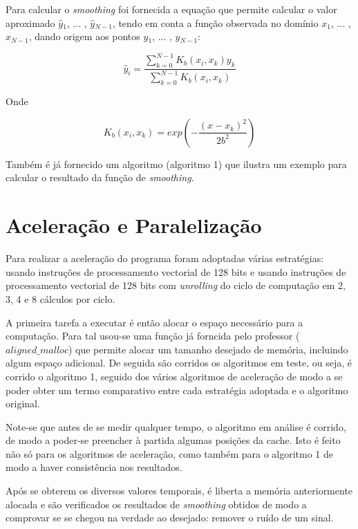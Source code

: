 \documentclass[a4paper]{article}
\begin{document}
	Para calcular o \textit{smoothing} foi fornecida a equação que permite calcular o valor aproximado $\hat{y}$$ _1$, $...$ , $\hat{y}$$ _{N-1}$, tendo em conta a função observada no domínio $x$$ _1$, $...$ , $x$$ _{N-1}$, dando origem aos pontos $y$$ _1$, $...$ , $y$$ _{N-1}$:
	
	\begin{equation}
		\hat{y}_i =  \frac{ \sum_{k=0}^{N-1} K_b (x_i, x_k ) y_k}{\sum_{k=0}^{N-1} K_b (x_i, x_k )} 
		\label{eq:smoothing_function}
	\end{equation}
	
	Onde
	
	\begin{equation}
		K_b (x_i,x_k)=exp\left(-\frac{(x-x_k)^2}{2b^2} \right)
		\label{eq:smoothing_kb}
	\end{equation}
	 	
	 	 
	Também é já fornecido um algoritmo (algoritmo 1) que ilustra um exemplo para calcular o resultado da função de \textit{smoothing}.
	
	
	\section{Aceleração e Paralelização}
	
	Para realizar a aceleração do programa foram adoptadas várias estratégias: usando instruções de processamento vectorial de 128 bits e usando instruções de processamento vectorial de 128 bits com \textit{unrolling} do ciclo de computação em 2, 3, 4 e 8 cálculos por ciclo.
	
	A primeira tarefa a executar é então alocar o espaço necessário para a computação. Para tal usou-se uma função já forncida pelo professor ($aligned\_malloc$) que permite alocar um tamanho desejado de memória, incluindo algum espaço adicional. De seguida são corridos os algoritmos em teste, ou seja, é corrido o algoritmo 1, seguido dos vários algoritmos de aceleração de modo a se poder obter um termo comparativo entre cada estratégia adoptada e o algoritmo original. 
	
	Note-se que antes de se medir qualquer tempo, o algoritmo em análise é corrido, de modo a poder-se preencher à partida algumas posições da cache. Isto é feito não só para os algoritmos de aceleração, como também para o algoritmo 1 de modo a haver consistência nos resultados.
	
	Após se obterem os diversos valores temporais, é liberta a memória anteriormente alocada e são verificados os resultados de \textit{smoothing} obtidos de modo a comprovar se se chegou na verdade ao desejado: remover o ruído de um sinal.
	
\end{document}

